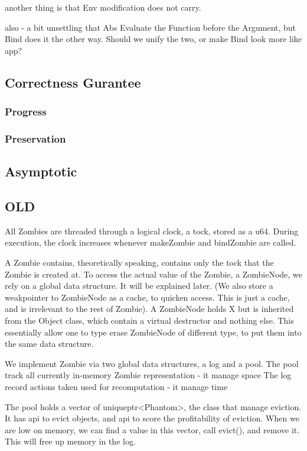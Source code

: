 another thing is that Env modification does not carry. 

also - a bit unsettling that Abs Evaluate the Function before the Argument, but Bind does it the other way. Should we unify the two, or make Bind look more like app?
\subsection{Correctness Gurantee}
\subsubsection{Progress}
\subsubsection{Preservation}
\subsection{Asymptotic}

\subsection{OLD}
All Zombies are threaded through a logical clock, a tock, stored as a u64.
During execution, the clock increases whenever makeZombie and bindZombie are called.

A Zombie contains, theoretically speaking, contains only the tock that the Zombie is created at.
To access the actual value of the Zombie, a ZombieNode, we rely on a global data structure.
It will be explained later.
(We also store a weakpointer to ZombieNode as a cache, to quicken access. This is just a cache, and is irrelevant to the rest of Zombie).
A ZombieNode holds X but is inherited from the Object class, which contain a virtual destructor and nothing else. This essentially allow one to type erase ZombieNode of different type, to put them into the same data structure.

We implement Zombie via two global data structures, a log and a pool.
The pool track all currently in-memory Zombie representation - it manage space
The log record actions taken used for recomputation - it manage time

The pool holds a vector of uniqueptr<Phantom>, the class that manage eviction.
It has api to evict objects, and api to score the profitability of eviction.
When we are low on memory, we can find a value in this vector, call evict(), and remove it.
This will free up memory in the log.


